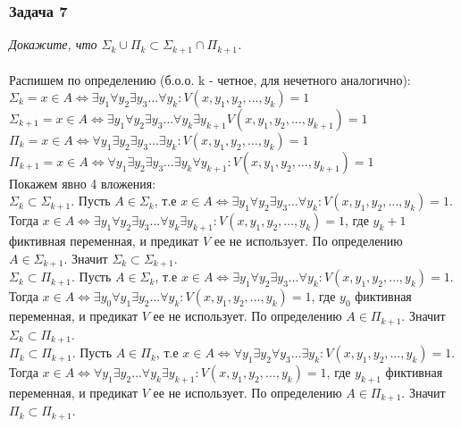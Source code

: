 \documentclass{article}
\begin{document}
\subsubsection*{Задача 7}
\textit{Докажите, что $\Sigma_k \cup \Pi_k \subset \Sigma_{k+1} \cap \Pi_{k+1}$.}\\
\\
Распишем по определению (б.о.о. k - четное, для нечетного аналогично):\\
$\Sigma_k = x \in A \Leftrightarrow \exists y_{1} \forall y_{2} \exists y_{3} \ldots \forall y_k : V\left(x, y_{1}, y_{2}, \ldots, y_{k}\right)=1$\\
$\Sigma_{k+1} = x \in A \Leftrightarrow \exists y_{1} \forall y_{2} \exists y_{3} \ldots \forall y_k \exists y_{k+1} V\left(x, y_{1}, y_{2}, \ldots, y_{k+1}\right)=1$\\
$\Pi_k = x \in A \Leftrightarrow \forall y_{1} \exists y_{2} \exists y_{3} \ldots \exists y_k : V\left(x, y_{1}, y_{2}, \ldots, y_{k}\right)=1$\\
$\Pi_{k+1} = x \in A \Leftrightarrow \forall y_{1} \exists y_{2} \exists y_{3} \ldots \exists y_k \forall y_{k+1} : V\left(x, y_{1}, y_{2}, \ldots, y_{k+1}\right)=1$\\
Покажем явно 4 вложения:\\
$\Sigma_k \subset \Sigma_{k+1}$. Пусть $A \in \Sigma_k$, т.е $x \in A \Leftrightarrow \exists y_{1} \forall y_{2} \exists y_{3} \ldots \forall y_k : V\left(x, y_{1}, y_{2}, \ldots, y_{k}\right)=1$. Тогда $x \in A \Leftrightarrow \exists y_{1} \forall y_{2} \exists y_{3} \ldots \forall y_k \exists y_{k+1} : V\left(x, y_{1}, y_{2}, \ldots, y_{k}\right)=1$, где $y_k+1$ фиктивная переменная, и предикат $V$ ее не использует. По определению $A \in \Sigma_{k+1}$. Значит $\Sigma_k \subset \Sigma_{k+1}$.\\
$\Sigma_k \subset \Pi_{k+1}$. Пусть $A \in \Sigma_k$, т.е $x \in A \Leftrightarrow \exists y_{1} \forall y_{2} \exists y_{3} \ldots \forall y_k : V\left(x, y_{1}, y_{2}, \ldots, y_{k}\right)=1$. Тогда $x \in A \Leftrightarrow \exists y_{0} \forall y_{1} \exists y_{2} \ldots \forall y_k : V\left(x, y_{1}, y_{2}, \ldots, y_{k}\right)=1$, где $y_0$ фиктивная переменная, и предикат $V$ ее не использует. По определению $A \in \Pi_{k+1}$. Значит $\Sigma_k \subset \Pi_{k+1}$.\\
$\Pi_k \subset \Pi_{k+1}$. Пусть $A \in \Pi_k$, т.е $x \in A \Leftrightarrow \forall y_{1} \exists y_{2} \forall y_{3} \ldots \exists y_k : V\left(x, y_{1}, y_{2}, \ldots, y_{k}\right)=1$. Тогда $x \in A \Leftrightarrow \forall y_{1} \exists y_{2} \ldots \forall y_k \exists y_{k+1} : V\left(x, y_{1}, y_{2}, \ldots, y_{k}\right)=1$, где $y_{k+1}$ фиктивная переменная, и предикат $V$ ее не использует. По определению $A \in \Pi_{k+1}$. Значит $\Pi_k \subset \Pi_{k+1}$.\\
\end{document}
